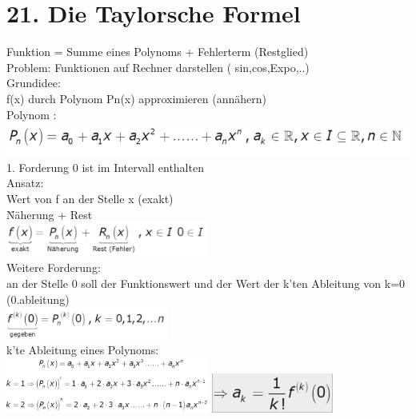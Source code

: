 \documentclass[12pt,a4paper]{article}
\begin{document}
\section{21. Die Taylorsche Formel}
Funktion = Summe eines Polynoms + Fehlerterm (Restglied) \\
Problem: Funktionen auf Rechner darstellen ( sin,cos,Expo,..)\\
Grundidee:\\
f(x) durch Polynom Pn(x) approximieren (annähern)\\
Polynom :\\
\includegraphics[width=1\textwidth]{Bilder/V1/1.png}
1. Forderung 0 ist im Intervall enthalten\\
Ansatz:\\
Wert von f an der Stelle x (exakt)\\
\= Näherung + Rest\\
\includegraphics[width=0.5\textwidth]{Bilder/V1/2.png}
\\
Weitere Forderung:\\
an der Stelle 0 soll der Funktionswert und der Wert der k'ten Ableitung von k=0 (0.ableitung)\\
\includegraphics[width=0.4\textwidth]{Bilder/V1/3.png}\\
k'te Ableitung eines Polynoms:\\
\includegraphics[width=0.5\textwidth]{Bilder/V1/4.png}
\includegraphics[width=0.3\textwidth]{Bilder/V1/5.png}
\end{document}
